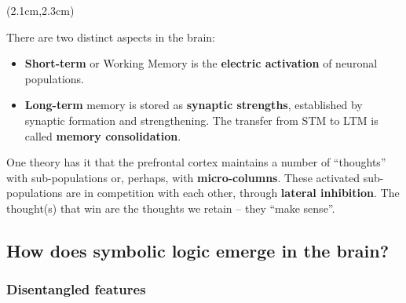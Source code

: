\begin{preview}

\cc{
\title{\vspace{-2.2cm} \bfseries\color{blue}{\large 大脑与 Transformer}}
}{
\title{\vspace{-2.2cm} \bfseries\color{blue}{\large Brain vs Transformer}}
}

\date{\vspace{-3.2cm}} %

\maketitle

\setcounter{section}{0}

\begin{textblock*}{5cm}(2.1cm,2.3cm) %
{}
\end{textblock*}

\begin{minipage}{\textwidth}
\setlength{\parskip}{0.4\baselineskip}

\vspace*{0.3cm} 

There are two distinct aspects in the brain:
	\begin{itemize}
		\item \textbf{Short-term} or Working Memory is the \textbf{electric activation} of neuronal populations.
		\item \textbf{Long-term} memory is stored as \textbf{synaptic strengths}, established by synaptic formation and strengthening.  The transfer from STM to LTM is called \textbf{memory consolidation}.
	\end{itemize}
	
One theory has it that the prefrontal cortex maintains a number of ``thoughts'' with sub-populations or, perhaps, with \textbf{micro-columns}.  These activated sub-populations are in competition with each other, through \textbf{lateral inhibition}.  The thought(s) that win are the thoughts we retain -- they ``make sense''.
	
\subsection{How does symbolic logic emerge in the brain?}

\subsubsection{Disentangled features}
	

\end{minipage}
\end{preview}
